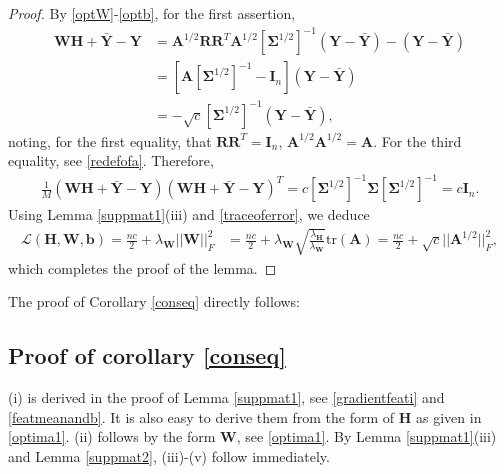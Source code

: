 \documentclass{article}
\theoremstyle{plain}
\theoremstyle{definition}
\theoremstyle{remark}
\newcommand{\bW}{{\mathbf W}}
\newcommand{\bY}{{\mathbf Y}}
\newcommand{\bR}{{\mathbf R}}
\newcommand{\bA}{{\mathbf A}}
\newcommand{\bH}{{\mathbf H}}
\newcommand{\bI}{{\mathbf I}}
\newcommand{\bYb}{{\bar{\mathbf Y}}}
\newcommand{\bb}{{\mathbf b}}
\newcommand{\bSigma}{{\mathbf \Sigma}}
\newcommand{\lH}{\lambda_{\bH}}
\newcommand{\lW}{\lambda_{\bW}}
\begin{document}
\begin{proof}
By \eqref{optW}-\eqref{optb}, for the first assertion,
\begin{align*}
 \bW \bH+\bYb-\bY&=\bA^{1/2} \bR \bR^T \bA^{1/2} [\bSigma^{1/2}]^{-1} (\bY-\bYb) -(\bY-\bYb)
 \\
 &=\left[ \bA [\bSigma^{1/2}]^{-1} -\bI_n\right] (\bY-\bYb)
 \\
 &=-\sqrt{c} [\bSigma^{1/2}]^{-1} (\bY-\bYb),
 \end{align*}
 noting, for the first equality, that $\bR \bR^T=\bI_n$, $\bA^{1/2} \bA^{1/2} = \bA$.
 For the third equality, see \eqref{redefofa}. Therefore,
\begin{align} \label{traceoferror}
\frac{1}{M} (\bW \bH+\bYb-\bY) (\bW \bH+\bYb-\bY)^T 
=
c [\bSigma^{1/2}]^{-1} \bSigma [\bSigma^{1/2}]^{-1}=c \bI_n.
\end{align}
Using Lemma \ref{suppmat1}(iii) and \eqref{traceoferror}, we deduce
\begin{align*}
\mathcal{L}(\bH, \bW, \bb)=\frac{n c}{2}+\lW ||\bW||_F^2&=\frac{n c}{2}+\lW \sqrt{\frac{\lH}{\lW}} \text{tr}(\bA)
=\frac{n c}{2}+\sqrt{c} ||\bA^{1/2}||_F^2,
\end{align*}
which completes the proof of the lemma.

\end{proof} 

The proof of Corollary \ref{conseq} directly follows:

\subsection{Proof of corollary \ref{conseq}}

(i) is derived in the proof of Lemma \ref{suppmat1}, see \eqref{gradientfeati} and \eqref{featmeanandb}. It is also easy to derive them from the form of $\bH$ as given in \eqref{optima1}. (ii) follows by the form $\bW$, see \eqref{optima1}. 
By Lemma \ref{suppmat1}(iii) and Lemma \ref{suppmat2}, (iii)-(v) follow immediately. 
\end{document}
